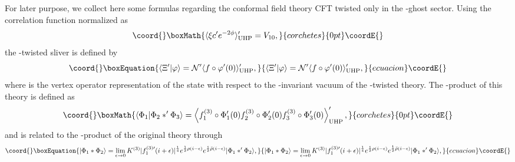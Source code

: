 \documentclass[a4paper,12pt]{article}
\providecommand{\cN}{\mathcal{N}}
\providecommand{\aaru}{\mathbf{R}}
\begin{document}
For later purpose, we collect here some formulas regarding the conformal field theory CFT\myHighlight{$^{\prime}$}\coordHE{} 
twisted only in the \coordHE{}-ghost sector. Using the correlation function normalized as 
\[\coord{}\boxMath{ \langle\xi c^{\prime}e^{-2\phi}\rangle^{\prime}_{\mathrm{UHP}}=V_{10}, }{corchetes}{0pt}\coordE{}\]
the \coordHE{}-twisted sliver \myHighlight{$\Xi^{\prime}$}\coordHE{} is defined by 
\begin{equation}\coord{}\boxEquation{
\langle\Xi^{\prime}|\varphi\rangle=\cN^{\prime}\langle f\circ\varphi^{\prime}(0)
\rangle^{\prime}_{\mathrm{UHP}}, \label{eq:GQ}
}{
\langle\Xi^{\prime}|\varphi\rangle=\cN^{\prime}\langle f\circ\varphi^{\prime}(0)
\rangle^{\prime}_{\mathrm{UHP}}, }{ecuacion}\coordE{}\end{equation}
where \coordHE{} is the vertex operator representation of the state \myHighlight{$|\varphi\rangle$}\coordHE{} 
with respect to the \myHighlight{$SL(2,\aaru)$}\coordHE{}-invariant vacuum \coordHE{} of the 
\coordHE{}-twisted theory. The \myHighlight{$*^{\prime}$}\coordHE{}-product of this theory is defined as 
\[\coord{}\boxMath{ \langle\Phi_1|\Phi_2*^{\prime}\Phi_3\rangle=\left\langle f^{(3)}_1\circ\Phi_1^{\prime}(0)
f^{(3)}_2\circ\Phi_2^{\prime}(0)f^{(3)}_3\circ\Phi_3^{\prime}(0)\right\rangle^{\prime}_{\mathrm{UHP}}, }{corchetes}{0pt}\coordE{}\]
and is related to the \myHighlight{$*$}\coordHE{}-product of the original theory through~\cite{GRSZ1} 
\begin{equation}\coord{}\boxEquation{
|\Phi_1*\Phi_2\rangle=\lim_{\epsilon\to 0}K^{(3)}|f^{(3)\prime}_1(i+\epsilon)|^{\frac{1}{4}}
e^{\frac{1}{2}\rho(i-\epsilon)}e^{\frac{1}{2}\bar{\rho}(i-\epsilon)}|\Phi_1*^{\prime}\Phi_2\rangle, 
\label{eq:GW}
}{
|\Phi_1*\Phi_2\rangle=\lim_{\epsilon\to 0}K^{(3)}|f^{(3)\prime}_1(i+\epsilon)|^{\frac{1}{4}}
e^{\frac{1}{2}\rho(i-\epsilon)}e^{\frac{1}{2}\bar{\rho}(i-\epsilon)}|\Phi_1*^{\prime}\Phi_2\rangle, 
}{ecuacion}\coordE{}\end{equation}
\end{document}
